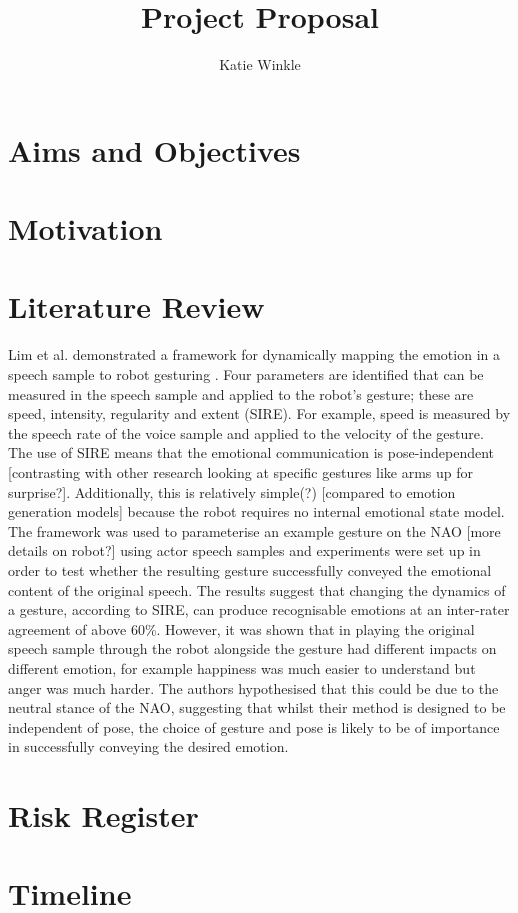 \documentclass[]{article}
\title{Project Proposal}
\author{Katie Winkle}
\begin{document}
\maketitle

\begin{abstract}

\end{abstract}

\tableofcontents

\section{Aims and Objectives}
\section{Motivation}
\section{Literature Review}
Lim et al. demonstrated a framework for dynamically mapping the emotion in a speech sample to robot gesturing \cite{lim2011converting}. Four parameters are identified that can be measured in the speech sample and applied to the robot's gesture; these are speed, intensity, regularity and extent (SIRE). For example, speed is measured by the speech rate of the voice sample and applied to the velocity of the gesture. The use of SIRE means that the emotional communication is pose-independent [contrasting with other research looking at specific gestures like arms up for surprise?]. Additionally, this is relatively simple(?) [compared to emotion generation models] because the robot requires no internal emotional state model. The framework was used to parameterise an example gesture on the NAO [more details on robot?] using actor speech samples and experiments were set up in order to test whether the resulting gesture successfully conveyed the emotional content of the original speech. The results suggest that changing the dynamics of a gesture, according to SIRE, can produce recognisable emotions at an inter-rater agreement of above 60\%. However, it was shown that in playing the original speech sample through the robot alongside the gesture had different impacts on different emotion, for example happiness was much easier to understand but anger was much harder. The authors hypothesised that this could be due to the neutral stance of the NAO, suggesting that whilst their method is designed to be independent of pose, the choice of gesture and pose is likely to be of importance in successfully conveying the desired emotion.


\section{Risk Register}
\section{Timeline}
\end{document}
